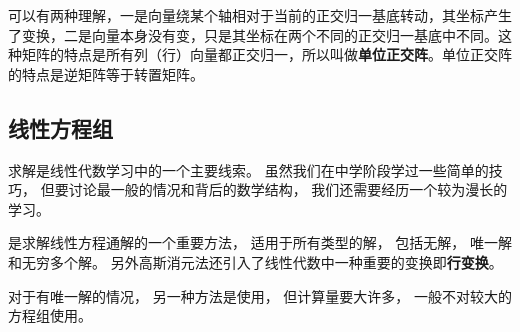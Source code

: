 
可以有两种理解，一是向量绕某个轴相对于当前的正交归一基底转动，其坐标产生了变换，二是向量本身没有变，只是其坐标在两个不同的正交归一基底中不同。这种矩阵的特点是所有列（行）向量都正交归一，所以叫做\textbf{单位正交阵}。单位正交阵的特点是逆矩阵等于转置矩阵。






\subsection{线性方程组}

求解是线性代数学习中的一个主要线索。 虽然我们在中学阶段学过一些简单的技巧， 但要讨论最一般的情况和背后的数学结构， 我们还需要经历一个较为漫长的学习。

是求解线性方程通解的一个重要方法， 适用于所有类型的解， 包括无解， 唯一解和无穷多个解。 另外高斯消元法还引入了线性代数中一种重要的变换即\textbf{行变换}。

对于有唯一解的情况， 另一种方法是使用， 但计算量要大许多， 一般不对较大的方程组使用。



